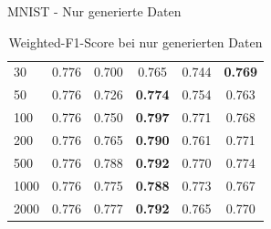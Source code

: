 \documentclass[10pt, compress]{beamer}
\begin{document}
\begin{frame}{MNIST - Nur generierte Daten}
\begin{table}[hbt]
{\begin{tabular}{l|c|c|c|c|c}
30                                                                           & 0.776    & 0.700 & 0.765                                                           & 0.744                                                           & \textbf{0.769} \\
50                                                                           & 0.776    & 0.726 & \textbf{0.774}                                                  & 0.754                                                           & 0.763          \\
100                                                                          & 0.776    & 0.750 & \textbf{0.797}                                                  & 0.771                                                           & 0.768          \\
200                                                                          & 0.776    & 0.765 & \textbf{0.790}                                                  & 0.761                                                           & 0.771          \\
500                                                                          & 0.776    & 0.788 & \textbf{0.792}                                                  & 0.770                                                           & 0.774          \\
1000                                                                         & 0.776    & 0.775 & \textbf{0.788}                                                  & 0.773                                                           & 0.767          \\
2000                                                                         & 0.776    & 0.777 & \textbf{0.792}                                                  & 0.765                                                           & 0.770          \\
\bottomrule
\end{tabular}}
\caption{Weighted-F1-Score bei nur generierten Daten}
\end{table}
\end{frame}
\end{document}
